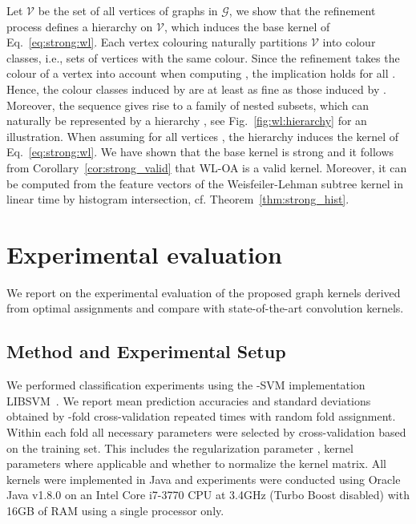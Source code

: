 \documentclass{article}
\newcommand{\V}{\ensuremath{\mathcal{V}}\xspace}
\newcommand{\G}{\ensuremath{\mathcal{G}}\xspace}
\begin{document}
Let \V be the set of all vertices of graphs in \G, we show that the refinement 
process defines a hierarchy on \V, which induces the base kernel of 
Eq.~\eqref{eq:strong:wl}.
Each vertex colouring  naturally partitions \V into colour classes, 
i.e., sets of vertices with the same colour.
Since the refinement takes the colour  of a vertex  into account 
when computing , the implication 
 holds
for all . 
Hence, the colour classes induced by  are at least as fine as those 
induced by . Moreover, the sequence  gives 
rise to a family of nested subsets, which can naturally be represented by a
hierarchy , see Fig.~\ref{fig:wl:hierarchy} for an illustration.
When assuming  for all vertices , the hierarchy induces
the kernel of Eq.~\eqref{eq:strong:wl}. 
We have shown that the base kernel is strong and it follows from 
Corollary~\ref{cor:strong_valid} that WL-OA is a valid kernel. Moreover,
it can be computed from the feature vectors of the Weisfeiler-Lehman subtree 
kernel in linear time by histogram intersection, cf. Theorem~\ref{thm:strong_hist}.



\section{Experimental evaluation}
We report on the experimental evaluation of the proposed graph kernels derived 
from optimal assignments and compare with state-of-the-art convolution kernels.

\subsection{Method and Experimental Setup}
We performed classification experiments using the -SVM implementation 
LIBSVM~\cite{Chang2011}.
We report mean prediction accuracies and standard deviations obtained by 
-fold cross-validation repeated  times with random fold assignment.
Within each fold all necessary parameters were selected by cross-validation 
based on the training set. This includes the regularization parameter , kernel
parameters where applicable and whether to normalize the kernel matrix.
All kernels were implemented in Java and experiments were conducted using 
Oracle Java v1.8.0 on an Intel Core i7-3770 CPU at 3.4GHz (Turbo Boost disabled)
with 16GB of RAM using a single processor only.
\end{document}
